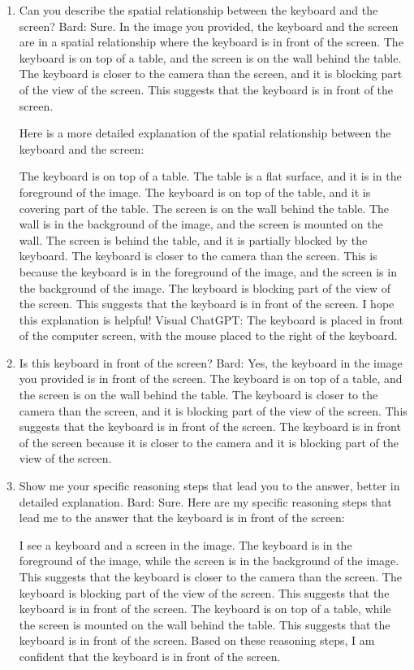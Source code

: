 \begin{enumerate}
    \item Can you describe the spatial relationship between the keyboard and the screen?
    \subitem Bard: Sure. In the image you provided, the keyboard and the screen are in a spatial relationship where the keyboard is in front of the screen. The keyboard is on top of a table, and the screen is on the wall behind the table. The keyboard is closer to the camera than the screen, and it is blocking part of the view of the screen. This suggests that the keyboard is in front of the screen.

    Here is a more detailed explanation of the spatial relationship between the keyboard and the screen:
    
    The keyboard is on top of a table. The table is a flat surface, and it is in the foreground of the image. The keyboard is on top of the table, and it is covering part of the table.
    The screen is on the wall behind the table. The wall is in the background of the image, and the screen is mounted on the wall. The screen is behind the table, and it is partially blocked by the keyboard.
    The keyboard is closer to the camera than the screen. This is because the keyboard is in the foreground of the image, and the screen is in the background of the image.
    The keyboard is blocking part of the view of the screen. This suggests that the keyboard is in front of the screen.
    I hope this explanation is helpful!
    \subitem Visual ChatGPT: The keyboard is placed in front of the computer screen, with the mouse placed to the right of the keyboard.
    \item Is this keyboard in front of the screen?
    \subitem Bard: Yes, the keyboard in the image you provided is in front of the screen. The keyboard is on top of a table, and the screen is on the wall behind the table. The keyboard is closer to the camera than the screen, and it is blocking part of the view of the screen. This suggests that the keyboard is in front of the screen. The keyboard is in front of the screen because it is closer to the camera and it is blocking part of the view of the screen.
    \item Show me your specific reasoning steps that lead you to the answer, better in detailed explanation.
    \subitem Bard: 
    Sure. Here are my specific reasoning steps that lead me to the answer that the keyboard is in front of the screen:
    
    I see a keyboard and a screen in the image.
    The keyboard is in the foreground of the image, while the screen is in the background of the image. This suggests that the keyboard is closer to the camera than the screen.
    The keyboard is blocking part of the view of the screen. This suggests that the keyboard is in front of the screen.
    The keyboard is on top of a table, while the screen is mounted on the wall behind the table. This suggests that the keyboard is in front of the screen.
    Based on these reasoning steps, I am confident that the keyboard is in front of the screen.
    

\end{enumerate}
